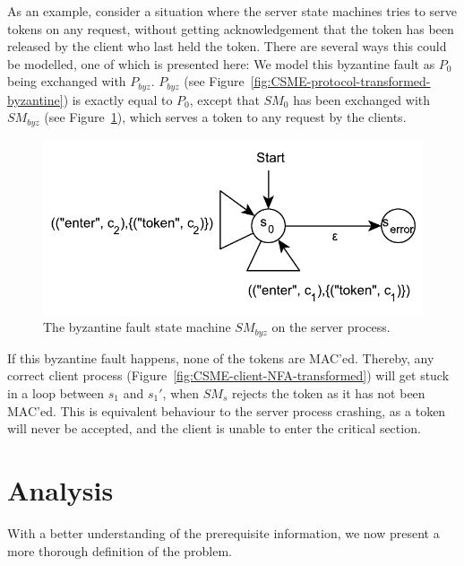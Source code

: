 \documentclass{article}
\begin{document}
		As an example, consider a situation where the server state machines tries to serve tokens on any request, without getting acknowledgement that the token has been released by the client who last held the token.
		There are several ways this could be modelled, one of which is presented here:
		We model this byzantine fault as $P_0$ being exchanged with $P_{byz}$.
		$P_{byz}$ (see Figure~\ref{fig:CSME-protocol-transformed-byzantine}) is exactly equal to $P_0$, except that $SM_0$ has been exchanged with $SM_{byz}$ (see Figure~\ref{fig:CSME-server-NFA-transformed-byzantine}), which serves a token to any request by the clients.

		\FloatBarrier
		\begin{figure}[ht!]
			\center
			\includegraphics[scale=0.6]{figures/state-machines/CSME-server-NFA-transformed-byzantine.pdf}
			\caption{The byzantine fault state machine $SM_{byz}$ on the server process.\label{fig:CSME-server-NFA-transformed-byzantine}}
		\end{figure}
		\FloatBarrier

		If this byzantine fault happens, none of the tokens are MAC'ed.
		Thereby, any correct client process (Figure~\ref{fig:CSME-client-NFA-transformed}) will get stuck in a loop between $s_1$ and $s_1'$, when $SM_s$ rejects the token as it has not been MAC'ed.
		This is equivalent behaviour to the server process crashing, as a token will never be accepted, and the client is unable to enter the critical section.

	\section{Analysis}
	\label{sec:analysis}

	With a better understanding of the prerequisite information, we now present a more thorough definition of the problem.
\end{document}
